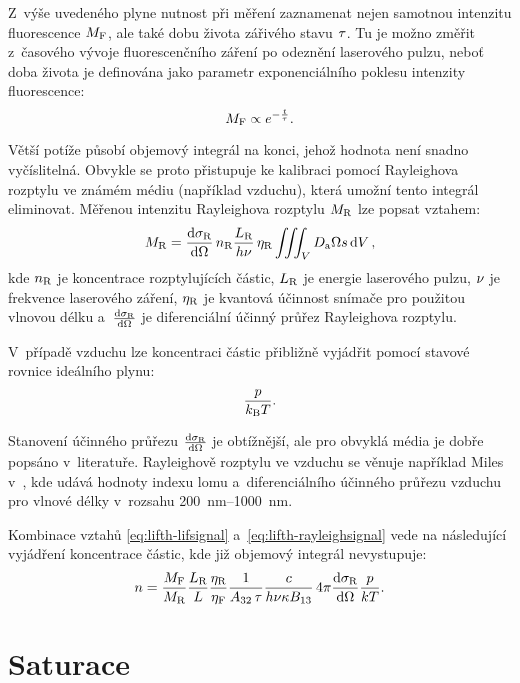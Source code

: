 Z~výše uvedeného plyne nutnost při měření zaznamenat nejen samotnou
intenzitu fluorescence $M_\text{F}$,
ale také dobu života zářivého stavu $\tau$.
Tu je možno změřit z~časového vývoje fluorescenčního záření po odeznění
laserového pulzu,
neboť doba života je definována jako parametr exponenciálního poklesu
intenzity fluorescence:
\begin{equation}
	M_\text{F} \propto e^{-\frac{t}{\tau}}.
\end{equation}

Větší potíže působí objemový integrál na konci, jehož hodnota není snadno
vyčíslitelná.
Obvykle se proto přistupuje ke kalibraci pomocí Ray\-leigh\-ova rozptylu
ve známém médiu (například vzduchu),
která umožní tento integrál eliminovat.
Měřenou intenzitu Rayleighova rozptylu $M_\text{R}$ lze popsat vztahem:
\begin{equation}
	\label{eq:lifth-rayleighsignal}
	M_\text{R} = \dv{\sigma_\text{R}}{\Omega} \, n_\text{R}
	\frac{L_\text{R}}{h\nu} \, \eta_\text{R}
	\iiint_V D_\text{a} \Omega s \dd{V},
\end{equation}
kde $n_\text{R}$ je koncentrace rozptylujících částic,
$L_\text{R}$ je energie laserového pulzu,
$\nu$ je frekvence laserového záření,
$\eta_\text{R}$ je kvantová účinnost snímače pro použitou vlnovou délku
a~$\dv{\sigma_\text{R}}{\Omega}$ je diferenciální účinný průřez Rayleighova rozptylu.

V~případě vzduchu lze koncentraci částic přibližně vyjádřit pomocí
stavové rovnice ideálního plynu:
\begin{equation}
	\frac{p}{k_\text{B}T}.
\end{equation}

Stanovení účinného průřezu $\dv{\sigma_\text{R}}{\Omega}$ je obtížnější,
ale pro obvyklá média je dobře popsáno v~literatuře.
Rayleighově rozptylu ve vzduchu se věnuje například Miles v~\cite{rayleigh},
kde udává hodnoty indexu lomu a~diferenciálního účinného průřezu vzduchu
pro vlnové délky v~rozsahu \SIrange{200}{1000}{\nano\metre}.

Kombinace vztahů \eqref{eq:lifth-lifsignal} a~\eqref{eq:lifth-rayleighsignal}
vede na následující vyjádření koncentrace částic,
kde již objemový integrál nevystupuje:
\begin{equation}
	\label{eq:lifth-ndens}
	n = \frac{M_\text{F}}{M_\text{R}}
	\frac{L_\text{R}}{L}\frac{\eta_\text{R}}{\eta_\text{F}}
	\frac{1}{A_{32}\,\tau}
	\frac{c}{h\nu\kappa B_{13}}
	\, 4\pi \dv{\sigma_\text{R}}{\Omega} \frac{p}{kT}.
\end{equation}

\section{Saturace}
\label{sec:lifth-saturation}
